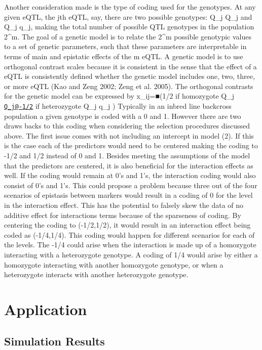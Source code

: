 \documentclass[]{book}
\theoremstyle{definition}
\theoremstyle{definition}
\theoremstyle{remark}
\begin{document}
Another consideration made is the type of coding used for the genotypes.
At any given eQTL, the jth eQTL, say, there are two possible genotypes:
Q\_j Q\_j and Q\_j q\_j, making the total number of possible QTL
genotypes in the population 2\^{}m. The goal of a genetic model is to
relate the 2\^{}m possible genotypic values to a set of genetic
parameters, such that these parameters are interpretable in terms of
main and epistatic effects of the m eQTL. A genetic model is to use
orthogonal contrast scales because it is consistent in the sense that
the effect of a eQTL is consistently defined whether the genetic model
includes one, two, three, or more eQTL (Kao and Zeng 2002; Zeng et al.
2005). The orthogonal contrasts for the genetic model can be expressed
by x\_ij=■(1/2 if homozygote Q\_j
\href{mailto:Q_j@-1/2}{\nolinkurl{Q\_j@-1/2}} if heterozygote Q\_j q\_j
) Typically in an inbred line backcross population a given genotype is
coded with a 0 and 1. However there are two draws backs to this coding
when considering the selection procedures discussed above. The first
issue comes with not including an intercept in model (2). If this is the
case each of the predictors would need to be centered making the coding
to -1/2 and 1/2 instead of 0 and 1. Besides meeting the assumptions of
the model that the predictors are centered, it is also beneficial for
the interaction effects as well. If the coding would remain at 0's and
1's, the interaction coding would also consist of 0's and 1's. This
could propose a problem because three out of the four scenarios of
epistasis between markers would result in a coding of 0 for the level in
the interaction effect. This has the potential to falsely skew the data
of no additive effect for interactions terms because of the sparseness
of coding. By centering the coding to (-1/2,1/2), it would result in an
interaction effect being coded as (-1/4,1/4). This coding would happen
for different scenarios for each of the levels. The -1/4 could arise
when the interaction is made up of a homozygote interacting with a
heterozygote genotype. A coding of 1/4 would arise by either a
homozygote interacting with another homozygote genotype, or when a
heterozygote interacts with another heterozygote genotype.

\section{Application}\label{application}

\subsection{Simulation Results}\label{simulation-results}
\end{document}
